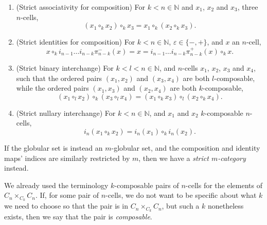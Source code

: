 \documentclass[12pt,a4paper]{article}
\numberwithin{equation}{section}
\begin{document}
\begin{definition}
\begin{enumerate}
        \item (Strict associativity for composition) For $k < n \in \mathbb{N}$ and $x_1$, $x_2$ and $x_3$, three $n$-cells, 
        \begin{equation}
            (x_1 \circ_k x_2) \circ_k x_3 =  x_1 \circ_k (x_2 \circ_k x_3).
        \end{equation}
        \item (Strict identities for composition) For $k < n \in \mathbb{N}$, $\varepsilon \in \{ -, + \}$, and $x$ an $n$-cell, 
        \begin{equation}
            x \circ_k i_{n-1} \dots i_{n-k} \pi^-_{n-k}(x) = x = i_{n-1} \dots i_{n-k} \pi^+_{n-k} (x) \circ_k x.
        \end{equation}
        \item (Strict binary interchange) For $k < l < n \in \mathbb{N}$, and $n$-cells $x_1$, $x_2$, $x_3$ and $x_4$, such that the ordered pairs $(x_1, x_2)$ and $(x_3, x_4)$ are both $l$-composable, while the ordered pairs $(x_1, x_3)$ and $(x_2, x_4)$ are both $k$-composable, 
        \begin{equation}
            (x_1 \circ_l x_2) \circ_k (x_3 \circ_l x_4) = (x_1 \circ_k x_3) \circ_l (x_2 \circ_k x_4).
        \end{equation}
        \item (Strict nullary interchange) For $k < n \in \mathbb{N}$, and $x_1$ and $x_2$ $k$-composable $n$-cells,
        \begin{equation}
            i_n (x_1 \circ_k x_2) = i_n(x_1) \circ_k i_n (x_2).
        \end{equation}
    \end{enumerate}
    If the globular set is instead an $m$-globular set, and the composition and identity maps' indices are similarly restricted by $m$, then we have a \emph{strict $m$-category} instead.
\end{definition}

\begin{remark}
    We already used the terminology $k$-composable pairs of $n$-cells for the elements of $C_n \mathop{\times}_{C_k} C_n$. If, for some pair of $n$-cells, we do not want to be specific about what $k$ we need to choose so that the pair is in $C_n \mathop{\times}_{C_k} C_n$, but such a $k$ nonetheless exists, then we say that the pair is \emph{composable}.
\end{remark}
\end{document}
